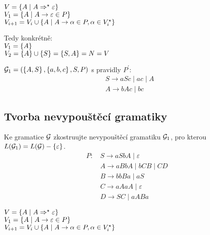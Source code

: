 $V = \left\lbrace A \mid A \Rightarrow^\star \varepsilon \right\rbrace$\\
$V_1 = \left\lbrace A \mid A \rightarrow \varepsilon \in P \right\rbrace$\\
$V_{i+1} = V_i \cup \left\lbrace A \mid A \rightarrow \alpha \in P, \alpha \in V_i^\star \right\rbrace$

Tedy konkrétně:\\
$V_1 = \left\lbrace A \right\rbrace$\\
$V_2 = \left\lbrace A \right\rbrace \cup \left\lbrace S \right\rbrace = \left\lbrace S,A \right\rbrace = N = V$

$\mathcal{G}_1 = (\left\lbrace A,S \right\rbrace, \left\lbrace a,b,c \right\rbrace, S, P)$ s pravidly $P^{'}$:
\begin{align*}
    & S \rightarrow aSc \mid ac \mid A \\
    & A \rightarrow bAc \mid bc
\end{align*}

\subsection{Tvorba nevypouštěcí gramatiky}
Ke gramatice $\mathcal{G}$ zkostruujte nevypouštěcí gramatiku $\mathcal{G}_1$, pro kterou $L(\mathcal{G}_1) = L(\mathcal{G}) - \left\lbrace \varepsilon \right\rbrace$.
    \begin{align*}
        P\text{: } & S \rightarrow aSbA \mid \varepsilon \\
           & A \rightarrow aBbA \mid bCB \mid CD \\
           & B \rightarrow bbBa \mid aS \\
           & C \rightarrow aAaA \mid \varepsilon \\
           & D \rightarrow SC \mid aABa
    \end{align*}

$V = \left\lbrace A \mid A \Rightarrow^\star \varepsilon \right\rbrace$\\
$V_1 = \left\lbrace A \mid A \rightarrow \varepsilon \in P \right\rbrace$\\
$V_{i+1} = V_i \cup \left\lbrace A \mid A \rightarrow \alpha \in P, \alpha \in V_i^\star \right\rbrace$

